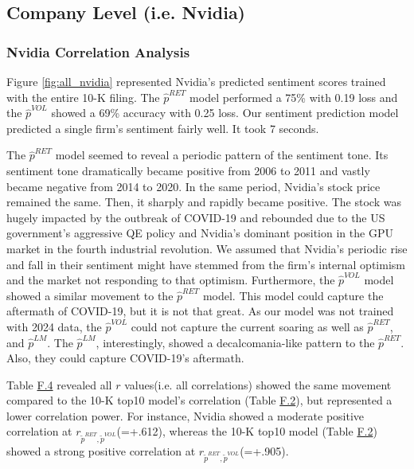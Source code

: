 \documentclass[logo,bsc,singlespacing,parskip]{infthesis}
\begin{document}


\subsection{Company Level (i.e. Nvidia)}
\subsubsection{Nvidia Correlation Analysis}


Figure \ref{fig:all_nvidia} represented Nvidia’s predicted sentiment scores trained with the entire 10-K filing. The $\hat{p}^{RET}$ model performed a 75\% with 0.19 loss and the $\hat{p}^{VOL}$ showed a 69\% accuracy with 0.25 loss. Our sentiment prediction model predicted a single firm’s sentiment fairly well. It took 7 seconds.

The $\hat{p}^{RET}$ model seemed to reveal a periodic pattern of the sentiment tone. Its sentiment tone dramatically became positive from 2006 to 2011 and vastly became negative from 2014 to 2020. In the same period, Nvidia's stock price remained the same.  Then, it sharply and rapidly became positive. The stock was hugely impacted by the outbreak of COVID-19 and rebounded due to the US government’s aggressive QE policy and Nvidia’s dominant position in the GPU market in the fourth industrial revolution. We assumed that Nvidia’s periodic rise and fall in their sentiment might have stemmed from the firm’s internal optimism and the market not responding to that optimism. Furthermore, the $\hat{p}^{VOL}$ model showed a similar movement to the $\hat{p}^{RET}$ model. This model could capture the aftermath of COVID-19, but it is not that great. As our model was not trained with 2024 data, the $\hat{p}^{VOL}$ could not capture the current soaring as well as $\hat{p}^{RET}$, and $\hat{p}^{LM}$. The $\hat{p}^{LM}$, interestingly, showed a decalcomania-like pattern to the $\hat{p}^{RET}$. Also, they could capture COVID-19’s aftermath. 

Table \hyperref[tab:all_nvidia_corr]{F.4} revealed all $r$ values(i.e. all correlations) showed the same movement compared to the 10-K top10 model’s correlation (Table \hyperref[tab:all_top10_corr]{F.2}), but represented a lower correlation power. For instance, Nvidia showed a moderate positive correlation at  $r_{\tilde{p}^{RET},\tilde{p}^{VOL}}$(=+.612), whereas the 10-K top10 model (Table \hyperref[tab:all_top10_corr]{F.2}) showed a strong positive correlation at  $r_{\tilde{p}^{RET},\tilde{p}^{VOL}}$(=+.905).
\end{document}
